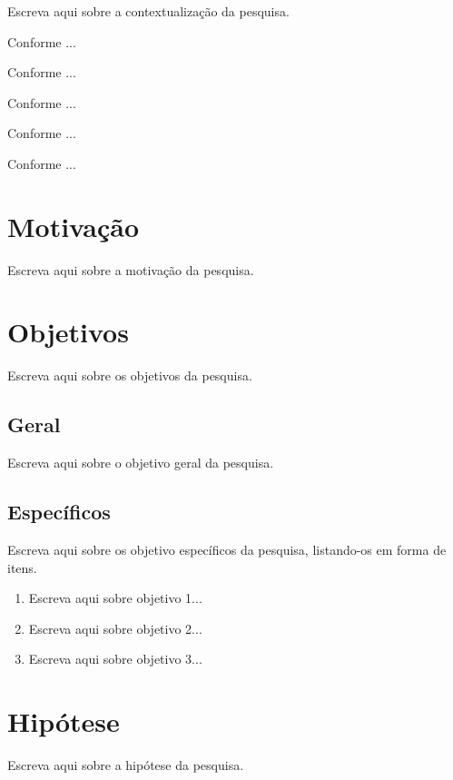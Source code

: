 \label{sec:introducao}

Escreva aqui sobre a contextualização da pesquisa.


Conforme ...

Conforme ...

Conforme ...

Conforme ...

Conforme ...

\section{Motivação}

Escreva aqui sobre a motivação da pesquisa.

\section{Objetivos}

Escreva aqui sobre os objetivos da pesquisa.

\subsection{Geral}

Escreva aqui sobre o objetivo geral da pesquisa.

\subsection{Específicos}

Escreva aqui sobre os objetivo específicos da pesquisa, listando-os em forma de itens.

\begin{enumerate}[label=(\alph*)]
	\item Escreva aqui sobre objetivo 1...
	\item Escreva aqui sobre objetivo 2...
	\item Escreva aqui sobre objetivo 3...
\end{enumerate}

\section{Hipótese}

Escreva aqui sobre a hipótese da pesquisa.

